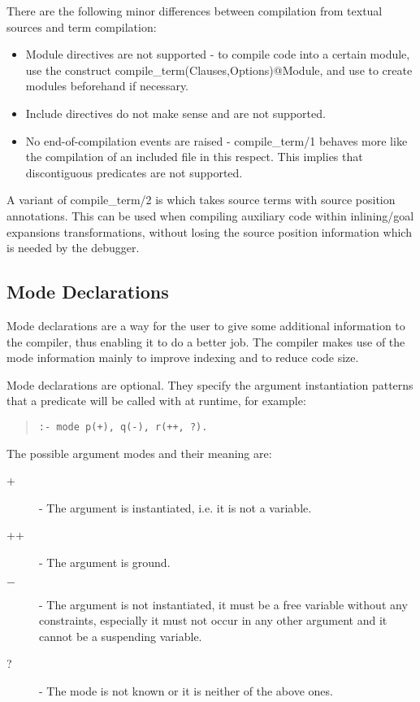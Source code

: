 There are the following minor differences between compilation from
textual sources and term compilation:
\begin{itemize}
\item Module directives are not supported - to compile code into a certain
    module, use the construct compile_term(Clauses,Options)@Module, and use
    to create modules beforehand if necessary.
\item Include directives do not make sense and are not supported.
\item No end-of-compilation events are raised - compile_term/1 behaves more
    like the compilation of an included file in this respect. This implies
    that discontiguous predicates are not supported.
\end{itemize}

A variant of compile_term/2 is
which takes source terms with source position annotations.
This can be used when compiling auxiliary code within inlining/goal
expansions transformations, without losing the source position information
which is needed by the debugger.


\subsection{Mode Declarations}
Mode declarations are a way for the user to give some additional
information to the compiler, thus enabling it to do a better job.
The {\eclipse} compiler makes use of the mode information mainly to
improve indexing and to reduce code size.

Mode declarations are optional. They specify the argument instantiation
patterns that a predicate will be called with at runtime, for example:
\begin{quote}
\begin{verbatim}
:- mode p(+), q(-), r(++, ?).
\end{verbatim}
\end{quote}
The possible argument modes and their meaning are:
\begin{description}
\item[+] - The argument is instantiated, i.e. it is not a variable.

\item[++] - The argument is ground.

\item[$-$] - The argument is not instantiated, it must be a free variable
without any constraints, especially it must not occur in any other
argument and it cannot be a suspending variable.

\item[?] - The mode is not known or it is neither of the above ones.
\end{description}

